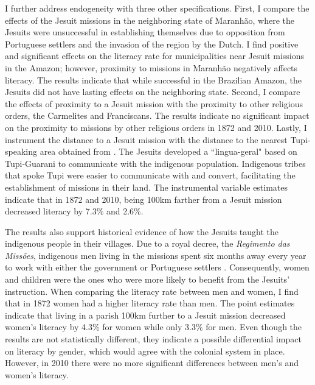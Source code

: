 \documentclass{article}
\begin{document}
I further address endogeneity with three other specifications. 
First, I compare the effects of the Jesuit missions in the neighboring state of Maranhão, where the Jesuits were unsuccessful in establishing themselves due to opposition from Portuguese settlers and the invasion of the region by the Dutch. 
I find positive and significant effects on the literacy rate for municipalities near Jesuit missions in the Amazon; however, proximity to missions in Maranhão negatively affects literacy. 
The results indicate that while successful in the Brazilian Amazon, the Jesuits did not have lasting effects on the neighboring state. 
Second, I compare the effects of proximity to a Jesuit mission with the proximity to other religious orders, the Carmelites and Franciscans. 
The results indicate no significant impact on the proximity to missions by other religious orders in 1872 and 2010.  
Lastly, I instrument the distance to a Jesuit mission with the distance to the nearest Tupi-speaking area obtained from \textcite{Clement2015-rf, Eriksen2011-cv}. 
The Jesuits developed a ``lingua-geral" based on Tupi-Guarani to communicate with the indigenous population. 
Indigenous tribes that spoke Tupi were easier to communicate with and convert, facilitating the establishment of missions in their land. 
The instrumental variable estimates indicate that in 1872 and 2010, being 100km farther from a Jesuit mission decreased literacy by 7.3\% and 2.6\%. 

The results also support historical evidence of how the Jesuits taught the indigenous people in their villages. 
Due to a royal decree, the \textit{Regimento das Missões}, indigenous men living in the missions spent six months away every year to work with either the government or Portuguese settlers \parencite{Hemming1987-vj}. 
Consequently, women and children were the ones who were more likely to benefit from the Jesuits' instruction. 
When comparing the literacy rate between men and women, I find that in 1872 women had a higher literacy rate than men. 
The point estimates indicate that living in a parish 100km further to a Jesuit mission decreased women's literacy by 4.3\% for women while only 3.3\% for men.
Even though the results are not statistically different, they indicate a possible differential impact on literacy by gender, which would agree with the colonial system in place. 
However, in 2010 there were no more significant differences between men's and women's literacy. 
\end{document}

